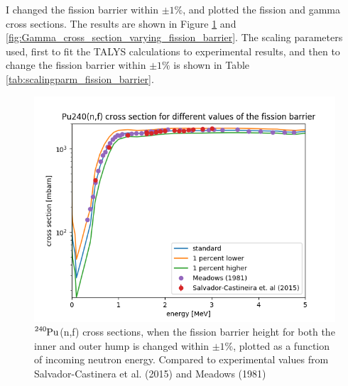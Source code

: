 \documentclass[]{article}
\begin{document}
 \noindent I changed the fission barrier within $\pm 1 \%$, and plotted the fission and gamma cross sections. The results are shown in Figure \ref{fig:Fission_cross_section_varying_fission_barrier} and \ref{fig:Gamma_cross_section_varying_fission_barrier}. The scaling parameters used, first to fit the TALYS calculations to experimental results, and then to change the fission barrier within $\pm 1 \%$ is shown in Table \ref{tab:scalingparm_fission_barrier}. 

  \begin{figure} [H]
	\centering
	\includegraphics[scale=0.7]{Fission_cross_section_varying_fission_barrier.png}
	\caption{ $\ce{^{240}Pu}$(n,f) cross sections, when the fission barrier height for both the inner and outer hump is changed within $\pm 1 \%$, plotted as a function of incoming neutron energy. Compared to experimental values from Salvador-Castinera et al. (2015) \cite{SALVADORCASTINEIRA2015177} and Meadows (1981) \cite{Meadows198}}
	\label{fig:Fission_cross_section_varying_fission_barrier}
\end{figure}
\end{document}
